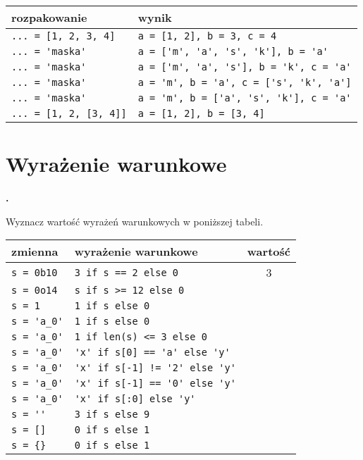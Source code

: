 \documentclass[a4paper]{article}
\begin{document}
\begin{tabular}{p{}|p{}}
\textsf{rozpakowanie} & \textsf{wynik} \\\hline
\verb|... = [1, 2, 3, 4]| & \verb|a = [1, 2], b = 3, c = 4| \\
\verb|... = 'maska'| & \verb|a = ['m', 'a', 's', 'k'], b = 'a'| \\
\verb|... = 'maska'| & \verb|a = ['m', 'a', 's'], b = 'k', c = 'a'| \\
\verb|... = 'maska'| & \verb|a = 'm', b = 'a', c = ['s', 'k', 'a']| \\
\verb|... = 'maska'| & \verb|a = 'm', b = ['a', 's', 'k'], c = 'a'| \\
\verb|... = [1, 2, [3, 4]]| & \verb|a = [1, 2], b = [3, 4]| \\
\end{tabular}


\section{Wyrażenie warunkowe}

\textbf{.}\addtocounter{zadanie}{1} Wyznacz wartość wyrażeń warunkowych w poniższej tabeli.

\begin{tabular}{l|l|c}
\textsf{zmienna} & \textsf{wyrażenie warunkowe} & \textsf{wartość} \\\hline
\verb|s = 0b10| & \verb|3 if s == 2 else 0| & 3\\
\verb|s = 0o14| & \verb|s if s >= 12 else 0| &\\
\verb|s = 1| & \verb|1 if s else 0| &\\
\verb|s = 'a_0'| & \verb|1 if s else 0|&\\
\verb|s = 'a_0'| & \verb|1 if len(s) <= 3 else 0|&\\
\verb|s = 'a_0'| & \verb|'x' if s[0] == 'a' else 'y'|&\\
\verb|s = 'a_0'| & \verb|'x' if s[-1] != '2' else 'y'|&\\
\verb|s = 'a_0'| & \verb|'x' if s[-1] == '0' else 'y'|&\\
\verb|s = 'a_0'| & \verb|'x' if s[:0] else 'y'|&\\
\verb|s = ''| & \verb|3 if s else 9|&\\
\verb|s = []| & \verb|0 if s else 1|&\\
\verb|s = {}| & \verb|0 if s else 1|&\\
\end{tabular}
\newline
\end{document}
